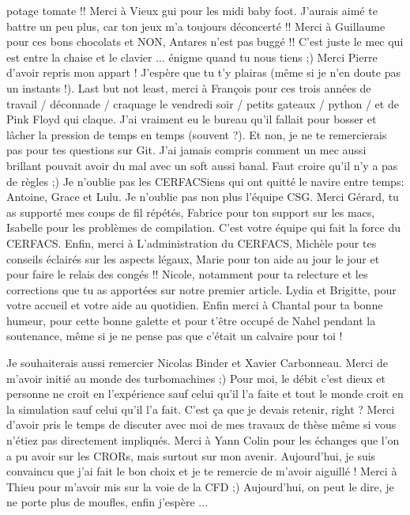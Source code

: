 potage tomate !! Merci à Vieux gui pour les midi baby foot. J'aurais aimé
te battre un peu plus, car ton jeux m'a toujours déconcerté !! 
Merci à Guillaume pour ces bons chocolats et NON, Antares n'est pas buggé !!
C'est juste le mec qui est entre la chaise et le clavier ... 
énigme quand tu nous tiens ;) 
Merci Pierre d'avoir repris mon appart ! J'espère que tu t'y plairas
(même si je n'en doute pas un instants !).
Last but not least, merci à François pour ces
trois années de travail / déconnade / craquage le vendredi soir / 
petits gateaux / python / et de Pink Floyd qui claque. J'ai vraiment
eu le bureau qu'il fallait pour bosser et lâcher la pression de temps
en temps (souvent ?). Et non, je ne te remercierais pas
pour tes questions sur Git. J'ai jamais compris comment 
un mec aussi brillant pouvait avoir du mal
avec un soft aussi banal. Faut croire qu'il n'y a pas de règles ;)
Je n'oublie pas les CERFACSiens qui ont quitté le navire entre temps:
Antoine, Grace et Lulu.
Je n'oublie pas non plus l'équipe CSG. Merci Gérard,
tu as supporté mes coups de fil répétés, Fabrice pour ton
support sur les macs, Isabelle pour les problèmes de
compilation. C'est votre équipe qui fait la force du CERFACS.
Enfin, merci à L'administration du CERFACS, Michèle pour tes
conseils éclairés sur les aspects légaux, Marie pour
ton aide au jour le jour et pour faire le relais des 
congés !! Nicole, notamment pour ta relecture et les
corrections que tu as apportées sur notre premier
article. Lydia et Brigitte, pour votre accueil
et votre aide au quotidien.
Enfin merci à Chantal pour ta bonne humeur, pour 
cette bonne galette et pour t'être occupé de
Nahel pendant la soutenance, même si je ne pense
pas que c'était un calvaire pour toi !

Je souhaiterais aussi remercier Nicolas Binder et
Xavier Carbonneau. 
Merci de m'avoir initié au monde des turbomachines ;) Pour moi,
le débit c'est dieux et personne ne croit en l'expérience
sauf celui qu'il l'a faite et tout le monde croit en la
simulation sauf celui qu'il l'a fait. 
C'est ça que je devais retenir, right ?
Merci d'avoir pris le temps de 
discuter avec moi de mes travaux de thèse même si
vous n'étiez pas directement impliqués.
Merci à Yann Colin pour les échanges que l'on a pu avoir
sur les CRORs, mais surtout sur mon avenir. Aujourd'hui,
je suis convaincu que j'ai fait le bon choix et je te remercie
de m'avoir aiguillé !
Merci à Thieu pour m'avoir mis sur la voie de la CFD ;)
Aujourd'hui, on peut le dire, je ne porte plus de moufles, enfin
j'espère ...

